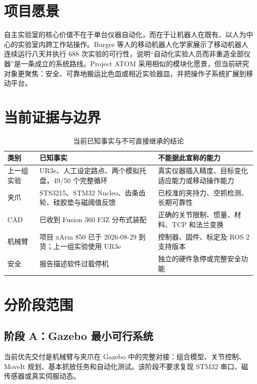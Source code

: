 \documentclass[UTF8,12pt,oneside]{ctexrep}
\begin{document}
\section{项目愿景}

自主实验室的核心价值不在于单台仪器自动化，而在于让机器人在既有、以人为中心的实验室内跨工作站操作。Burger 等人的移动机器人化学家展示了移动机器人连续运行八天并执行 688 次实验的可行性，说明“自动化实验人员而非重造全部仪器”是一条成立的系统路线\cite{burger2020mobile}。Project ATOM 采用相似的模块化愿景，但当前研究对象更聚焦：安全、可靠地搬运比色皿或相近实验器皿，并把操作子系统扩展到移动平台。

\section{当前证据与边界}

\begin{table}[H]
\centering
\caption{当前已知事实与不可直接继承的结论}
\begin{tabularx}{\textwidth}{L{3.2cm}YY}
\toprule
类别 & 已知事实 & 不能据此宣称的能力 \\
\midrule
上一组实验 & UR3e、人工设定路点、两个模拟托盘，49/50 个完整循环 & 真实仪器插入精度、目标变化适应能力或移动操作能力 \\
夹爪 & STS3215、STM32 Nucleo、齿条齿轮、硅胶垫与磁阈值反馈 & 已校准的夹持力、空抓检测、长期可靠性 \\
CAD & 已收到 Fusion 360 F3Z 分布式装配 & 正确的关节限制、惯量、材料、TCP 和法兰变换 \\
机械臂 & 项目 xArm 850 已于 2026-08-29 到货；上一组实验使用 UR3e & 控制器、固件、标定及 ROS 2 支持版本 \\
安全 & 报告描述软件过载停机 & 独立的硬件急停或完整安全功能 \\
\bottomrule
\end{tabularx}
\end{table}

\section{分阶段范围}

\subsection{阶段 A：Gazebo 最小可行系统}

当前优先交付是机械臂与夹爪在 Gazebo 中的完整对接：组合模型、关节控制、MoveIt 规划、基本抓放任务和自动化测试。该阶段不要求复现 STM32 串口、磁传感器或真实伺服动态。
\end{document}
